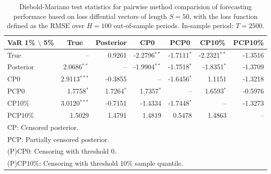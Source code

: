 { \renewcommand{\arraystretch}{1.2} 
\begin{table}[!ht] 
\center 
\begin{tabular}{l | rrr rrr} 
VaR 1\% $\setminus$ 5\% & \multicolumn{1}{c}{True} & \multicolumn{1}{c}{Posterior} & \multicolumn{1}{c}{CP0} & \multicolumn{1}{c}{PCP0} & \multicolumn{1}{c}{CP10\%} & \multicolumn{1}{c}{PCP10\%} \\ \hline 
True &    --\phantom{$^{***}$} & 0.9261\phantom{$^{***}$} & -2.2796$^{**}$\phantom{$^{*}$} & -1.7111$^{*}$\phantom{$^{**}$} & -2.2321$^{**}$\phantom{$^{*}$} & -1.3516\phantom{$^{***}$}  \\ 
Posterior & 2.0686$^{**}$\phantom{$^{*}$} &    --\phantom{$^{***}$} & -1.9904$^{**}$\phantom{$^{*}$} & -1.7518$^{*}$\phantom{$^{**}$} & -1.8351$^{*}$\phantom{$^{**}$} & -1.3709\phantom{$^{***}$}  \\ 
CP0 & 2.9113$^{***}$ & -0.3855\phantom{$^{***}$} &    --\phantom{$^{***}$} & -1.6456$^{*}$\phantom{$^{**}$} & 1.1151\phantom{$^{***}$} & -1.3218\phantom{$^{***}$}  \\ 
PCP0 & 1.7758$^{*}$\phantom{$^{**}$} & 1.7264$^{*}$\phantom{$^{**}$} & 1.7357$^{*}$\phantom{$^{**}$} &    --\phantom{$^{***}$} & 1.6593$^{*}$\phantom{$^{**}$} & -0.5976\phantom{$^{***}$}  \\ 
CP10\% & 3.0120$^{***}$ & -0.7151\phantom{$^{***}$} & -1.4334\phantom{$^{***}$} & -1.7448$^{*}$\phantom{$^{**}$} &    --\phantom{$^{***}$} & -1.3273\phantom{$^{***}$}  \\ 
PCP10\% & 1.5029\phantom{$^{***}$} & 1.4791\phantom{$^{***}$} & 1.4819\phantom{$^{***}$} & 0.5478\phantom{$^{***}$} & 1.4863\phantom{$^{***}$} &    --\phantom{$^{***}$}  \\ 
\hline 
\multicolumn{7}{l}{\footnotesize{CP: Censored posterior.}}  \\ 
\multicolumn{7}{l}{\footnotesize{PCP: Partially censored posterior.}} \\ 
\multicolumn{7}{l}{\footnotesize{(P)CP0: Censoring with threshold 0.}} \\ 
\multicolumn{7}{l}{\footnotesize{(P)CP10\%: Censoring with threshold 10\% sample quantile.}}  \\ 
\end{tabular}
 \caption{Diebold-Mariano test statistics for  pairwise method comparision of forecasting performace based on loss diffential vectors of length $S = 50$, with the loss function defined as the RMSE over $H=100$ out-of-sample periods. In-sample period: $T = 2500$.} 
\label{tab:garch11_DM_T_2500}  
\end{table}
}